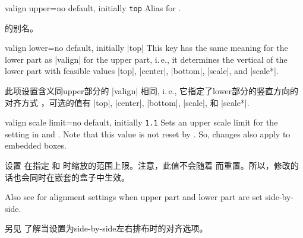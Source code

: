 \begin{docTcbKey}[][doc new=2015-05-07]{valign upper}{=}{no default, initially \texttt{top}}
Alias for .

 的别名。
\end{docTcbKey}

\begin{docTcbKey}{valign lower}{=}{no default, initially |top|}
This key has the same meaning for the lower part as |valign|
for the upper part, i.\,e., it determines
the vertical  of the lower part with feasible values
|top|, |center|, |bottom|, |scale|, and |scale*|.

此项设置含义同upper部分的 |valign| 相同, i.\,e., 它指定了lower部分的竖直方向的对齐方式  ，可选的值有 |top|, |center|, |bottom|, |scale|, 和 |scale*|.

\end{docTcbKey}

\begin{docTcbKey}[][doc new=2015-07-16]{valign scale limit}{=}{no default, initially \texttt{1.1}}
Sets an upper scale limit for the  setting in
 and .
Note that this value is not reset by . So, changes
also apply to embedded boxes.

设置  在指定  和  时缩放的范围上限。注意，此值不会随着  而重置。所以，修改的话也会同时在嵌套的盒子中生效。
\end{docTcbKey}

Also see  for alignment settings when
upper part and lower part are set side-by-side.

另见  了解当设置为side-by-side左右排布时的对齐选项。